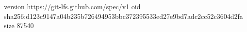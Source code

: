 version https://git-lfs.github.com/spec/v1
oid sha256:d123c9147a04b235b726494953bbc372395533ed27e9bd7adc2cc52c3604d2fa
size 87540
